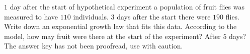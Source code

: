 $1$ day after the start of hypothetical experiment a population of fruit flies was measured to have $110$ individuals. $3$ days after the start there were $190$ flies. Write down an exponential growth law that fits this data. According to the model, how may fruit were there at the start of the experiment? After $5$ days? The answer key has not been proofread, use with caution.

